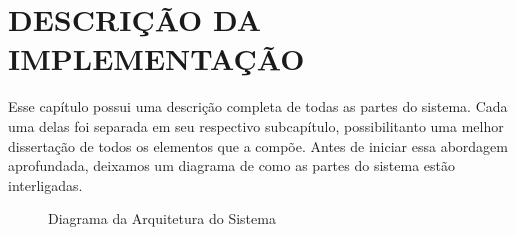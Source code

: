 
\chapter{DESCRIÇÃO DA IMPLEMENTAÇÃO}
\label{chap:descricao_da_implementacao}

Esse capítulo possui uma descrição completa de todas as partes do sistema. Cada uma delas foi separada em seu respectivo subcapítulo, possibilitanto uma melhor dissertação de todos os elementos que a compõe. Antes de iniciar essa abordagem aprofundada, deixamos um diagrama de como as partes do sistema estão interligadas.

\begin{figure}[!htb]
    \centering
    \caption{Diagrama da Arquitetura do Sistema}
    \label{fig:diagrama_arquitetura}
\end{figure}

